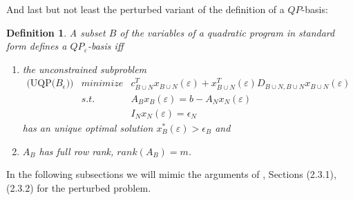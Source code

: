 \documentclass[a4paper]{article}
\newtheorem{definition}{Definition}
\begin{document}
And last but not least the perturbed variant of the definition of a $QP$-basis:
\begin{definition}
A subset $B$ of the variables of a quadratic program in standard form defines
a $QP_{\varepsilon}$-basis iff
\begin{enumerate}
  \item the unconstrained subproblem
    \begin{eqnarray}
      \mbox{(UQP($B_{\epsilon}$))} & minimize & c_{B \cup N}^{T}
       x_{B \cup N}(\varepsilon) 
        + x_{B \cup N}^{T}(\varepsilon)D_{B \cup N, B \cup N}
	x_{B \cup N}(\varepsilon)  \nonumber\\
\label{eq:QP_eps_basis_feasibility_B}
      & s.t.  &A_{B} x_{B}(\varepsilon) = b - A_{N}x_{N}(\varepsilon)  \\
\label{eq:QP_eps_basis_feasibility_N}
           &  &I_{N} x_{N}(\varepsilon) = \epsilon_{N}   
    \end{eqnarray}
    has an unique optimal solution $x_{B}^{*}(\varepsilon) > \epsilon_{B}$ and 
  \item $A_{B}$ has full row rank, $rank(A_{B})=m$. 
\end{enumerate}
\end{definition}
In the following subsections we will mimic the arguments of \cite{Sven},
Sections (2.3.1), (2.3.2) for the perturbed problem.
\end{document}
